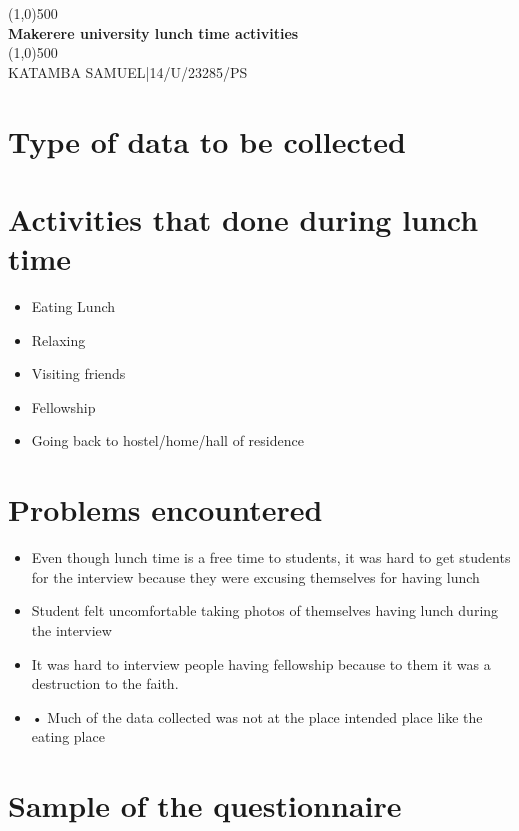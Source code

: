 \documentclass[12pt,a4paper]{article}
\begin{document}
\begin{titlepage}
    \begin{center}
\line(1,0){500}\\
\huge{\bfseries Makerere university lunch time activities\\}
\line(1,0){500}\\
[0.25in]
KATAMBA SAMUEL|14/U/23285/PS\\


\end{center}
\end{titlepage}
\section{Type of data to be collected}
\section{Activities that done during lunch time}
\begin{itemize}
\item Eating Lunch
\item Relaxing
\item Visiting friends
\item Fellowship
\item Going back to hostel/home/hall of residence

\end{itemize}

\section{Problems encountered}
\begin{itemize}
\item Even though lunch time is a free time to students, it was hard to get students for the interview because they were excusing themselves for having lunch
\item Student felt uncomfortable taking photos of themselves having lunch during the interview
\item It was hard to interview people having fellowship because to them it was a destruction to the faith.
\item •	Much of the data collected was not at the place intended place like the eating place

\end{itemize}


\section{Sample of the questionnaire}
\end{document}
